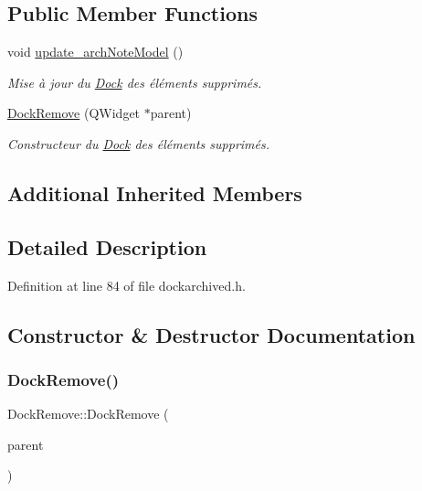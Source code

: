 \subsection*{Public Member Functions}
\begin{DoxyCompactItemize}
\item 
\mbox{\label{class_dock_remove_a4e653c9a21161b7d76c9cfd330579047}} 
void \hyperlink{class_dock_remove_a4e653c9a21161b7d76c9cfd330579047}{update\+\_\+arch\+Note\+Model} ()
\begin{DoxyCompactList}\small\item\em Mise à jour du \hyperlink{class_dock}{Dock} des éléments supprimés. \end{DoxyCompactList}\item 
\hyperlink{class_dock_remove_aa2665bd1459600d9346029df9f2bba27}{Dock\+Remove} (Q\+Widget $\ast$parent)
\begin{DoxyCompactList}\small\item\em Constructeur du \hyperlink{class_dock}{Dock} des éléments supprimés. \end{DoxyCompactList}\end{DoxyCompactItemize}
\subsection*{Additional Inherited Members}


\subsection{Detailed Description}


Definition at line 84 of file dockarchived.\+h.



\subsection{Constructor \& Destructor Documentation}
\mbox{\label{class_dock_remove_aa2665bd1459600d9346029df9f2bba27}} 
\subsubsection{\texorpdfstring{Dock\+Remove()}{DockRemove()}}
{\footnotesize\ttfamily Dock\+Remove\+::\+Dock\+Remove (\begin{DoxyParamCaption}\item[{Q\+Widget $\ast$}]{parent }\end{DoxyParamCaption})}




